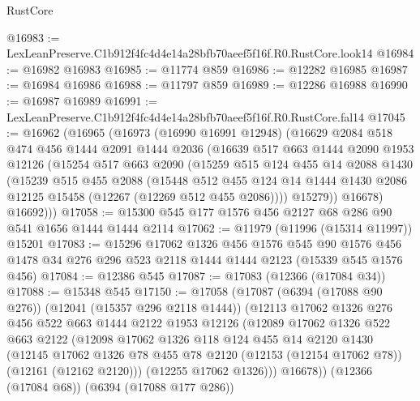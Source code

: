 \begin{lexlean}{RustCore}
\begin{coremodule}
@16983 := LexLeanPreserve.C1b912f4fc4d4e14a28bfb70aeef5f16f.R0.RustCore.look14
@16984 := @16982 @16983
@16985 := @11774 @859
@16986 := @12282 @16985
@16987 := @16984 @16986
@16988 := @11797 @859
@16989 := @12286 @16988
@16990 := @16987 @16989
@16991 := LexLeanPreserve.C1b912f4fc4d4e14a28bfb70aeef5f16f.R0.RustCore.fal14
@17045 := @16962
    (@16965
      (@16973
        (@16990 @16991 @12948)
        (@16629
          @2084
          @518
          @474
          @456
          @1444
          @2091
          @1444
          @2036
          (@16639
            @517
            @663
            @1444
            @2090
            @1953
            @12126
            (@15254
              @517
              @663
              @2090
              (@15259
                @515
                @124
                @455
                @14
                @2088
                @1430
                (@15239
                  @515
                  @455
                  @2088
                  (@15448
                    @512
                    @455
                    @124
                    @14
                    @1444
                    @1430
                    @2086
                    @12125
                    @15458
                    (@12267 (@12269 @512 @455 @2086))))
                @15279))
            @16678)
          @16692)))
@17058 := @15300 @545 @177 @1576 @456 @2127 @68 @286 @90 @541 @1656 @1444 @1444 @2114
@17062 := @11979 (@11996 (@15314 @11997)) @15201
@17083 := @15296
    @17062
    @1326
    @456
    @1576
    @545
    @90
    @1576
    @456
    @1478
    @34
    @276
    @296
    @523
    @2118
    @1444
    @1444
    @2123
    (@15339 @545 @1576 @456)
@17084 := @12386 @545
@17087 := @17083 (@12366 (@17084 @34))
@17088 := @15348 @545
@17150 := @17058
    (@17087
      (@6394 (@17088 @90 @276))
      (@12041 (@15357 @296 @2118 @1444))
      (@12113
        @17062
        @1326
        @276
        @456
        @522
        @663
        @1444
        @2122
        @1953
        @12126
        (@12089
          @17062
          @1326
          @522
          @663
          @2122
          (@12098
            @17062
            @1326
            @118
            @124
            @455
            @14
            @2120
            @1430
            (@12145
              @17062
              @1326
              @78
              @455
              @78
              @2120
              (@12153 (@12154 @17062 @78))
              (@12161 (@12162 @2120)))
            (@12255 @17062 @1326)))
        @16678))
    (@12366 (@17084 @68))
    (@6394 (@17088 @177 @286))

\end{coremodule}
\end{lexlean}
